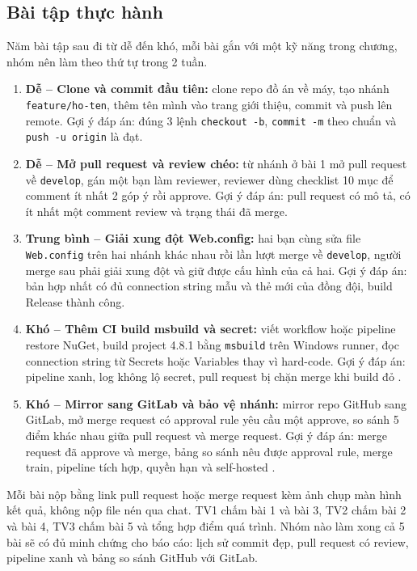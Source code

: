 \subsection{Bài tập thực hành}
\label{subsec:c7-baitap}

Năm bài tập sau đi từ dễ đến khó, mỗi bài gắn với một kỹ năng trong chương, nhóm nên làm theo thứ tự trong 2 tuần.

\begin{enumerate}
\item \textbf{Dễ -- Clone và commit đầu tiên:} clone repo đồ án về máy, tạo nhánh \verb|feature/ho-ten|, thêm tên mình vào trang giới thiệu, commit và push lên remote. Gợi ý đáp án: đúng 3 lệnh \verb|checkout -b|, \verb|commit -m| theo chuẩn và \verb|push -u origin| là đạt.
\item \textbf{Dễ -- Mở pull request và review chéo:} từ nhánh ở bài 1 mở pull request về \texttt{develop}, gán một bạn làm reviewer, reviewer dùng checklist 10 mục để comment ít nhất 2 góp ý rồi approve. Gợi ý đáp án: pull request có mô tả, có ít nhất một comment review và trạng thái đã merge.
\item \textbf{Trung bình -- Giải xung đột Web.config:} hai bạn cùng sửa file \texttt{Web.config} trên hai nhánh khác nhau rồi lần lượt merge về \texttt{develop}, người merge sau phải giải xung đột và giữ được cấu hình của cả hai. Gợi ý đáp án: bản hợp nhất có đủ connection string mẫu và thẻ mới của đồng đội, build Release thành công.
\item \textbf{Khó -- Thêm CI build msbuild và secret:} viết workflow hoặc pipeline restore NuGet, build project 4.8.1 bằng \verb|msbuild| trên Windows runner, đọc connection string từ Secrets hoặc Variables thay vì hard-code. Gợi ý đáp án: pipeline xanh, log không lộ secret, pull request bị chặn merge khi build đỏ \cite{ghactions,gitlabci,msmsbuild}.
\item \textbf{Khó -- Mirror sang GitLab và bảo vệ nhánh:} mirror repo GitHub sang GitLab, mở merge request có approval rule yêu cầu một approve, so sánh 5 điểm khác nhau giữa pull request và merge request. Gợi ý đáp án: merge request đã approve và merge, bảng so sánh nêu được approval rule, merge train, pipeline tích hợp, quyền hạn và self-hosted \cite{githubdocs,gitlabdocs}.
\end{enumerate}

Mỗi bài nộp bằng link pull request hoặc merge request kèm ảnh chụp màn hình kết quả, không nộp file nén qua chat.
TV1 chấm bài 1 và bài 3, TV2 chấm bài 2 và bài 4, TV3 chấm bài 5 và tổng hợp điểm quá trình.
Nhóm nào làm xong cả 5 bài sẽ có đủ minh chứng cho báo cáo: lịch sử commit đẹp, pull request có review, pipeline xanh và bảng so sánh GitHub với GitLab.

